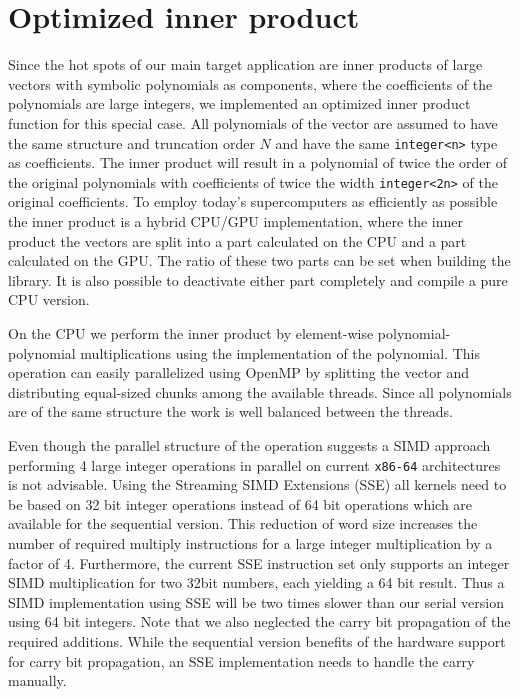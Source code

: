 \documentclass[oribibl,a4paper]{llncs2e/llncs}
\begin{document}
\section{Optimized inner product}
Since the hot spots of our main target application are inner products of large vectors with symbolic polynomials as components, where the coefficients of the polynomials are large integers, we implemented an optimized inner product function for this special case.
All polynomials of the vector are assumed to have the same structure and truncation order $N$ and have the same \verb|integer<n>| type as coefficients.
The inner product will result in a polynomial of twice the order of the original polynomials with coefficients of twice the width \verb|integer<2n>| of the original coefficients.
To employ today's supercomputers as efficiently as possible the inner product is a hybrid CPU/GPU implementation,
where the inner product the vectors are split into a part calculated on the CPU and a part calculated on the GPU.
The ratio of these two parts can be set when building the library.
It is also possible to deactivate either part completely and compile a pure CPU version.

On the CPU we perform the inner product by element-wise polynomial-polynomial multiplications using the implementation of the polynomial.
This operation can easily parallelized using OpenMP by splitting the vector and distributing equal-sized chunks among the available threads.
Since all polynomials are of the same structure the work is well balanced between the threads.

Even though the parallel structure of the operation suggests a SIMD approach performing 4 large integer operations in parallel on current \verb|x86-64| architectures is not advisable.
Using the Streaming SIMD Extensions (SSE) all kernels need to be based on 32 bit integer operations instead of 64 bit operations which are available for the sequential version.
This reduction of word size increases the number of required multiply instructions for a large integer multiplication by a factor of 4.
Furthermore, the current SSE instruction set only supports an integer SIMD multiplication for two 32bit numbers, each yielding a 64 bit result.
Thus a SIMD implementation using SSE will be two times slower than our serial version using 64 bit integers.
Note that we also neglected the carry bit propagation of the required additions.
While the sequential version benefits of the hardware support for carry bit propagation, an SSE implementation needs to handle the carry manually.
\end{document}
